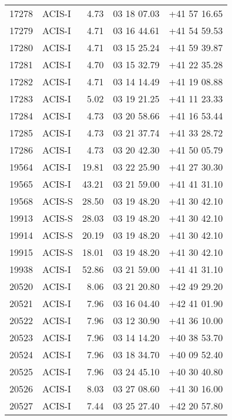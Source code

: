 \begin{supertabular}{rlrll}
  17278 &     ACIS-I &           4.73 & 03 18 07.03 & +41 57 16.65 \\
  17279 &     ACIS-I &           4.71 & 03 16 44.61 & +41 54 59.53 \\
  17280 &     ACIS-I &           4.71 & 03 15 25.24 & +41 59 39.87 \\
  17281 &     ACIS-I &           4.70 & 03 15 32.79 & +41 22 35.28 \\
  17282 &     ACIS-I &           4.71 & 03 14 14.49 & +41 19 08.88 \\
  17283 &     ACIS-I &           5.02 & 03 19 21.25 & +41 11 23.33 \\
  17284 &     ACIS-I &           4.73 & 03 20 58.66 & +41 16 53.44 \\
  17285 &     ACIS-I &           4.73 & 03 21 37.74 & +41 33 28.72 \\
  17286 &     ACIS-I &           4.73 & 03 20 42.30 & +41 50 05.79 \\
  19564 &     ACIS-I &          19.81 & 03 22 25.90 & +41 27 30.30 \\
  19565 &     ACIS-I &          43.21 & 03 21 59.00 & +41 41 31.10 \\
  19568 &     ACIS-S &          28.50 & 03 19 48.20 & +41 30 42.10 \\
  19913 &     ACIS-S &          28.03 & 03 19 48.20 & +41 30 42.10 \\
  19914 &     ACIS-S &          20.19 & 03 19 48.20 & +41 30 42.10 \\
  19915 &     ACIS-S &          18.01 & 03 19 48.20 & +41 30 42.10 \\
  19938 &     ACIS-I &          52.86 & 03 21 59.00 & +41 41 31.10 \\
  20520 &     ACIS-I &           8.06 & 03 21 20.80 & +42 49 29.20 \\
  20521 &     ACIS-I &           7.96 & 03 16 04.40 & +42 41 01.90 \\
  20522 &     ACIS-I &           7.96 & 03 12 30.90 & +41 36 10.00 \\
  20523 &     ACIS-I &           7.96 & 03 14 14.20 & +40 38 53.70 \\
  20524 &     ACIS-I &           7.96 & 03 18 34.70 & +40 09 52.40 \\
  20525 &     ACIS-I &           7.96 & 03 24 45.10 & +40 30 40.80 \\
  20526 &     ACIS-I &           8.03 & 03 27 08.60 & +41 30 16.00 \\
  20527 &     ACIS-I &           7.44 & 03 25 27.40 & +42 20 57.80 \\

\end{supertabular}

